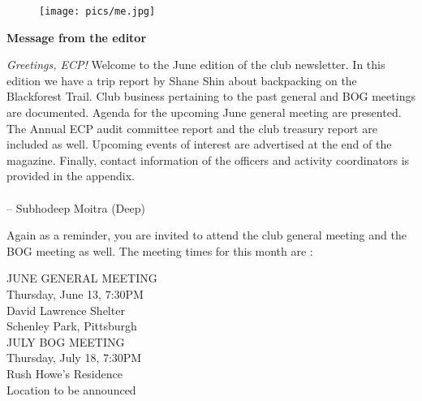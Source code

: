 \documentclass[10pt,a4paper]{article}
\newcommand{\NewsItem}[1]{%
		\usefont{T1}{augie}{m}{n} 	
		\large \bf #1 \vspace{4pt}
		\par \normalsize \normalfont}
\begin{document}
\begin{center}
\begin{minipage}[h]{0.8\linewidth}
	\begin{wrapfigure}{l}{0.41\textwidth}
		\texttt{[image: pics/me.jpg]}
		\\%
	\end{wrapfigure}
	
	\NewsItem{Message from the editor}

	\emph{Greetings, ECP!} Welcome to the June edition of the club newsletter. In this edition we have a trip report by Shane Shin about backpacking on the Blackforest Trail. Club business pertaining to the past general and BOG meetings are documented. Agenda for the upcoming June general meeting are presented. The Annual ECP audit committee report and the club treasury report are included as well.  Upcoming events of interest are advertised at the end of the magazine. Finally, contact information of the officers and activity coordinators is provided in the appendix. 
\\
\\
-- Subhodeep Moitra (Deep)

\vspace{0.5cm}



	Again as a reminder, you are invited to attend the club general meeting and the BOG meeting as well. The meeting times for this month are :
	
\vspace{1cm}

\begin{multicols}{2}
\Large



JUNE GENERAL MEETING\\
Thursday, June 13, 7:30PM\\
David Lawrence Shelter\\
Schenley Park, Pittsburgh
\\
JULY BOG MEETING\\
Thursday, July 18, 7:30PM\\
Rush Howe's Residence \\ 
Location to be announced

\normalsize
\end{multicols}
	
\end{minipage}
\end{center}
\end{document}
